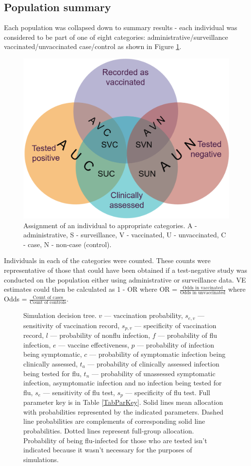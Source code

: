 \documentclass[11pt]{article}
\begin{document}
\subsection{Population summary}

Each population was collapsed down to summary results - each individual was considered to be part of one of eight categories: administrative/surveillance vaccinated/unvaccinated case/control as shown in Figure \ref{PopAgg}.

\begin{figure}[h]
	\centering
		\includegraphics[width=0.5\linewidth]{../sim-diag/popagg-venn.png}
		\caption{
Assignment of an individual to appropriate categories. A - administrative, S - surveillance, V - vaccinated, U - unvaccinated, C - case, N - non-case (control). \label{PopAgg}
		}
\end{figure}

Individuals in each of the categories were counted. These counts were representative of those that could have been obtained if a test-negative study was conducted on the population either using administrative or surveillance data. VE estimates could then be calculated as 1 - OR where OR = $\frac{\text{Odds in vaccinated}}{\text{Odds in unvaccinated}}$ where Odds = $\frac{\text{Count of cases}}{\text{Count of controls}}$.

\pagebreak

\begin{figure}[H]
	\centering
		
		\caption{
Simulation decision tree. $v$ --- vaccination probability, $s_{e,v}$ --- sensitivity of vaccination record, $s_{p,v}$ --- specificity of vaccination record, $l$ --- probability of nonflu infection, $f$ --- probability of flu infection, $e$ --- vaccine effectiveness, $p$ --- probability of infection being symptomatic, $c$ --- probability of symptomatic infection being clinically assessed, $t_a$ --- probability of clinically assessed infection being tested for flu, $t_n$ --- probability of unassessed symptomatic infection, asymptomatic infection and no infection being tested for flu, $s_e$ --- sensitivity of flu test, $s_p$ --- specificity of flu test. Full parameter key is in Table \ref{TabParKey}. Solid lines mean allocation with probabilities represented by the indicated parameters. Dashed line probabilities are complements of corresponding solid line probabilities. Dotted lines represent full-group allocation. Probability of being flu-infected for those who are tested isn't indicated because it wasn't necessary for the purposes of simulations. \label{SimDiag}
		}
\end{figure}
\end{document}
